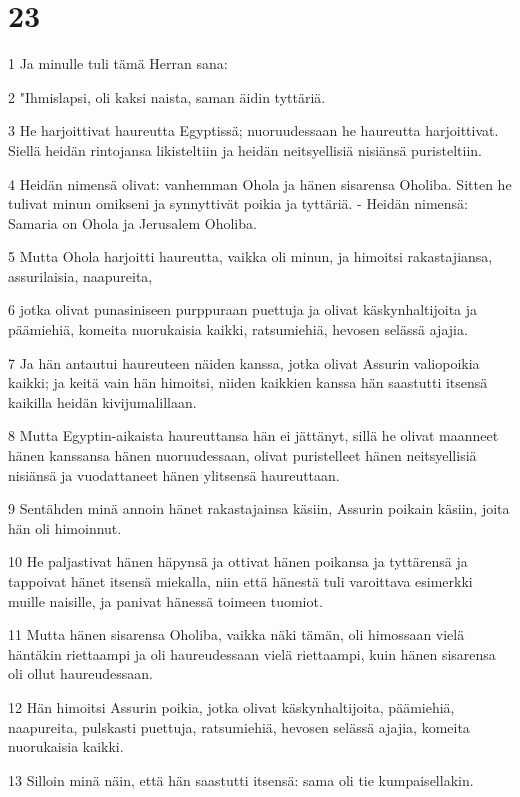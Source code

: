 \chapter{23}

\par 1 Ja minulle tuli tämä Herran sana:
\par 2 "Ihmislapsi, oli kaksi naista, saman äidin tyttäriä.
\par 3 He harjoittivat haureutta Egyptissä; nuoruudessaan he haureutta harjoittivat. Siellä heidän rintojansa likisteltiin ja heidän neitsyellisiä nisiänsä puristeltiin.
\par 4 Heidän nimensä olivat: vanhemman Ohola ja hänen sisarensa Oholiba. Sitten he tulivat minun omikseni ja synnyttivät poikia ja tyttäriä. - Heidän nimensä: Samaria on Ohola ja Jerusalem Oholiba.
\par 5 Mutta Ohola harjoitti haureutta, vaikka oli minun, ja himoitsi rakastajiansa, assurilaisia, naapureita,
\par 6 jotka olivat punasiniseen purppuraan puettuja ja olivat käskynhaltijoita ja päämiehiä, komeita nuorukaisia kaikki, ratsumiehiä, hevosen selässä ajajia.
\par 7 Ja hän antautui haureuteen näiden kanssa, jotka olivat Assurin valiopoikia kaikki; ja keitä vain hän himoitsi, niiden kaikkien kanssa hän saastutti itsensä kaikilla heidän kivijumalillaan.
\par 8 Mutta Egyptin-aikaista haureuttansa hän ei jättänyt, sillä he olivat maanneet hänen kanssansa hänen nuoruudessaan, olivat puristelleet hänen neitsyellisiä nisiänsä ja vuodattaneet hänen ylitsensä haureuttaan.
\par 9 Sentähden minä annoin hänet rakastajainsa käsiin, Assurin poikain käsiin, joita hän oli himoinnut.
\par 10 He paljastivat hänen häpynsä ja ottivat hänen poikansa ja tyttärensä ja tappoivat hänet itsensä miekalla, niin että hänestä tuli varoittava esimerkki muille naisille, ja panivat hänessä toimeen tuomiot.
\par 11 Mutta hänen sisarensa Oholiba, vaikka näki tämän, oli himossaan vielä häntäkin riettaampi ja oli haureudessaan vielä riettaampi, kuin hänen sisarensa oli ollut haureudessaan.
\par 12 Hän himoitsi Assurin poikia, jotka olivat käskynhaltijoita, päämiehiä, naapureita, pulskasti puettuja, ratsumiehiä, hevosen selässä ajajia, komeita nuorukaisia kaikki.
\par 13 Silloin minä näin, että hän saastutti itsensä: sama oli tie kumpaisellakin.
